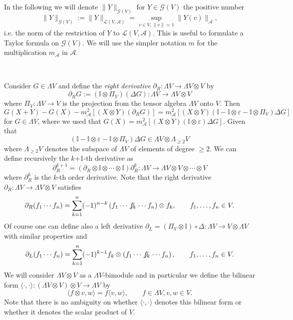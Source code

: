 \documentclass{article}
\newcommand{\assign}{:=}
\newcommand{\tmtextit}[1]{{\itshape{#1}}}
\begin{document}
In the following we will denote $\| Y \|_{\mathcal{G} (V)}$ for $Y \in
\mathcal{G} (V)$ the positive number
\[ \| Y \|_{\mathcal{G} (V)} \assign \| Y \|_{\mathcal{L} (V, \mathcal{A})} =
   \sup_{v \in V, \| v \| = 1} \| Y (v) \|_{\mathcal{A}}, \]
i.e. the norm of the restriction of $Y$ to $\mathcal{L} (V, \mathcal{A})$.
This is useful to formulate a Taylor formula on $\mathcal{G} (V)$. We will use
the simpler notation $m$ for the multiplication $m_{\mathcal{A}}$ in
$\mathcal{A}$.

\

Consider $G \in \Lambda V$ and define the \tmtextit{right derivative}
$\partial_R : \Lambda V \rightarrow \Lambda V \otimes V$ by
\begin{equation}
  \partial_R G \assign (\mathbb{I} \otimes \Pi_V) (\Delta G) : \Lambda V
  \rightarrow \Lambda V \otimes V \label{eq:derivativeR}
\end{equation}
where $\Pi_V : \Lambda V \rightarrow V$ is the projection from the tensor
algebra $\Lambda V$ onto $V$. Then
\[ G (X + Y) - G (X) - m_{\mathcal{A}}^2 [(X \otimes Y) (\partial_R G)] =
   m_{\mathcal{A}}^2 [(X \otimes Y) (\mathbb{I}-\mathbb{I} \otimes \varepsilon
   -\mathbb{I} \otimes \Pi_V) \Delta G] \]
for $G \in \Lambda V$, where we used that $G (X) = m_{\mathcal{A}}^2 [(X
\otimes Y) (\mathbb{I} \otimes \varepsilon) \Delta G]$. Given that
\[ (\mathbb{I}-\mathbb{I} \otimes \varepsilon -\mathbb{I} \otimes \Pi_V)
   \Delta G \in \Lambda V \otimes \Lambda_{\geqslant 2} V \]
where $\Lambda_{\geqslant 2} V$ denotes the subspace of $\Lambda V$ of
elements of degree $\geqslant 2$. We can define recursively the $k$+1-th
derivative as
\[ \partial_R^{k + 1} = (\partial_R \otimes \mathbb{I} \otimes \cdots \otimes
   \mathbb{I}) \partial_R^k : \Lambda V \rightarrow \Lambda V \otimes V
   \otimes \cdots \otimes V \]
where $\partial_R^k$ is the $k$-th order derivative. Note that the right
derivative $\partial_R : \Lambda V \rightarrow \Lambda V \otimes V$ satisfies
\[ \partial_R (f_1 \cdots f_n) = \sum_{k = 1}^n (- 1)^{n - k} \left( f_1
   \cdots \centernot{f_k} \cdots f_n \right) \otimes f_k, \qquad f_1, \ldots, f_n
   \in V. \]
Of course one can define also a left derivative $\partial_L = (\Pi_V \otimes
\mathbb{I}) \circ \Delta : \Lambda V \rightarrow V \otimes \Lambda V$ with
similar properties and
\[ \partial_L (f_1 \cdots f_n) = \sum_{k = 1}^n (- 1)^{k - 1} f_k \otimes
   \left( f_1 \cdots \centernot{f_k} \cdots f_n \right), \qquad f_1, \ldots, f_n \in
   V. \]
We will consider $\Lambda V \otimes V$ as a $\Lambda V$-bimodule and in
particular we define the bilinear form $\langle \cdot, \cdot \rangle :
(\Lambda V \otimes V) \otimes V \rightarrow \Lambda V$ by
\begin{equation}
  \langle f \otimes v, w \rangle = f \langle v, w \rangle, \qquad f \in
  \Lambda V, v, w \in V. \label{eq:bimodule}
\end{equation}
Note that there is no ambiguity on whether $\langle \cdot, \cdot \rangle$
denotes this bilinear form or whether it denotes the scalar product of $V$.
\end{document}
